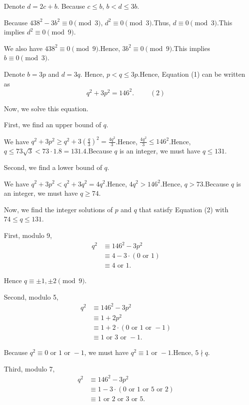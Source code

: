 \begin{enumerate}
 Denote $d = 2 c + b$. Because $c \leq b$, $b < d \leq 3 b$.

 Because $438^2 - 3 b^2 \equiv 0 \pmod{3}$, $d^2 \equiv 0 \pmod{3}$.Thus, $d \equiv 0 \pmod{3}$.This implies $d^2 \equiv 0 \pmod{9}$. 

 We also have $438^2 \equiv 0 \pmod{9}$.Hence, $3 b^2 \equiv 0 \pmod{9}$.This implies $b \equiv 0 \pmod{3}$.

 Denote $b = 3 p$ and $d = 3 q$. Hence, $p < q \leq 3 p$.Hence, Equation (1) can be written as
 \[ q^2 + 3 p^2 = 146^2 . \hspace{1cm} (2) \]

 Now, we solve this equation.

 First, we find an upper bound of $q$.

 We have $q^2 + 3 p^2 \geq q^2 + 3 \left( \frac{q}{3} \right)^2 = \frac{4 q^2}{3}$.Hence, $\frac{4 q^2}{3} \leq 146^2$.Hence, $q \leq 73 \sqrt{3} < 73 \cdot 1.8 = 131.4$.Because $q$ is an integer, we must have $q \leq 131$.

 Second, we find a lower bound of $q$.

 We have $q^2 + 3 p^2 < q^2 + 3 q^2 = 4 q^2$.Hence, $4 q^2 > 146^2$.Hence, $q > 73$.Because $q$ is an integer, we must have $q \geq 74$.

 Now, we find the integer solutions of $p$ and $q$ that satisfy Equation (2) with $74 \leq q \leq 131$.

 First, modulo 9, 
 \begin{align*} q^2 & \equiv 146^2 - 3 p^2 \\ & \equiv 4 - 3 \cdot ( 0 \mbox{ or } 1 ) \\ & \equiv 4 \mbox{ or } 1 . \end{align*}


 Hence $q \equiv \pm 1, \pm 2 \pmod{9}$.

 Second, modulo 5, 
 \begin{align*} q^2 & \equiv 146^2 - 3 p^2 \\ & \equiv 1 + 2 p^2 \\ & \equiv 1 + 2 \cdot ( 0 \mbox{ or } 1 \mbox{ or } -1 ) \\ & \equiv 1 \mbox{ or } 3 \mbox{ or } - 1 . \end{align*}


 Because $q^2 \equiv 0 \mbox{ or } 1 \mbox{ or } - 1$, we must have $q^2 \equiv 1 \mbox{ or } - 1$.Hence, $5 \nmid q$.

 Third, modulo 7,
 \begin{align*} q^2 & \equiv 146^2 - 3 p^2 \\ & \equiv 1 - 3 \cdot ( 0 \mbox{ or } 1 \mbox{ or } 5 \mbox{ or } 2 ) \\ & \equiv 1 \mbox{ or } 2 \mbox{ or } 3 \mbox{ or } 5 . \end{align*}



\end{enumerate}
